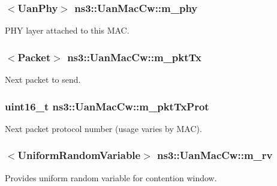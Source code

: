 \subsubsection[{\texorpdfstring{m\+\_\+phy}{m_phy}}]{$<${\bf Uan\+Phy}$>$ ns3\+::\+Uan\+Mac\+Cw\+::m\+\_\+phy\hspace{0.3cm}{\ttfamily [private]}}\hypertarget{classns3_1_1UanMacCw_adab4ab8156181e2562419770378d6fe4}{}\label{classns3_1_1UanMacCw_adab4ab8156181e2562419770378d6fe4}
P\+HY layer attached to this M\+AC. 
\subsubsection[{\texorpdfstring{m\+\_\+pkt\+Tx}{m_pktTx}}]{$<${\bf Packet}$>$ ns3\+::\+Uan\+Mac\+Cw\+::m\+\_\+pkt\+Tx\hspace{0.3cm}{\ttfamily [private]}}\hypertarget{classns3_1_1UanMacCw_a172da34ee7c04174ede573f71f04895f}{}\label{classns3_1_1UanMacCw_a172da34ee7c04174ede573f71f04895f}
Next packet to send. 
\subsubsection[{\texorpdfstring{m\+\_\+pkt\+Tx\+Prot}{m_pktTxProt}}]{\setlength{\rightskip}{0pt plus 5cm}uint16\+\_\+t ns3\+::\+Uan\+Mac\+Cw\+::m\+\_\+pkt\+Tx\+Prot\hspace{0.3cm}{\ttfamily [private]}}\hypertarget{classns3_1_1UanMacCw_aecae266cc09d3efd3a79103bda2710f3}{}\label{classns3_1_1UanMacCw_aecae266cc09d3efd3a79103bda2710f3}
Next packet protocol number (usage varies by M\+AC). 
\subsubsection[{\texorpdfstring{m\+\_\+rv}{m_rv}}]{$<${\bf Uniform\+Random\+Variable}$>$ ns3\+::\+Uan\+Mac\+Cw\+::m\+\_\+rv\hspace{0.3cm}{\ttfamily [private]}}\hypertarget{classns3_1_1UanMacCw_a5b41287415a347117aeb966f6b1a389c}{}\label{classns3_1_1UanMacCw_a5b41287415a347117aeb966f6b1a389c}
Provides uniform random variable for contention window. 
